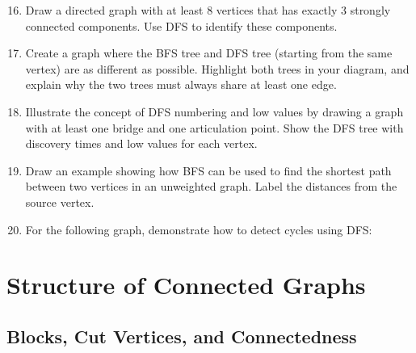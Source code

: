\documentclass{article}
\theoremstyle{definition}
\begin{document}
\begin{enumerate}\setcounter{enumi}{15}
\item Draw a directed graph with at least 8 vertices that has exactly 3 strongly connected components. Use DFS to identify these components.

\item Create a graph where the BFS tree and DFS tree (starting from the same vertex) are as different as possible. Highlight both trees in your diagram, and explain why the two trees must always share at least one edge.

\item Illustrate the concept of DFS numbering and low values by drawing a graph with at least one bridge and one articulation point. Show the DFS tree with discovery times and low values for each vertex.

\item Draw an example showing how BFS can be used to find the shortest path between two vertices in an unweighted graph. Label the distances from the source vertex.

\item For the following graph, demonstrate how to detect cycles using DFS:
\begin{center}
\end{center}
\end{enumerate}


\pagebreak
\newpage


\section{Structure of Connected Graphs}

\subsection{Blocks, Cut Vertices, and Connectedness}
\end{document}
